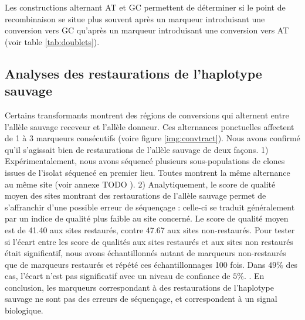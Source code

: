 Les constructions alternant AT et GC permettent de déterminer si le point de
recombinaison se situe plus souvent après un marqueur introduisant une
conversion vers GC qu'après un marqueur introduisant une conversion vers AT
(voir table \ref{tab:doublets}).



\subsection{Analyses des restaurations de l'haplotype sauvage}
\label{subsec:restaur}


Certains transformants montrent des régions de conversions qui alternent entre
l'allèle sauvage receveur et l'allèle donneur. Ces alternances ponctuelles
affectent de 1 à 3 marqueurs consécutifs (voire figure \ref{img:convtract}).
Nous avons confirmé qu'il s'agissait bien de restaurations de l'allèle sauvage
de deux façons. 1) Expérimentalement, nous avons séquencé plusieurs
sous-populations de clones issues de l'isolat séquencé en premier lieu. Toutes
montrent la même alternance au même site (voir annexe TODO
). 2) Analytiquement, le score de qualité moyen des sites montrant des
restaurations de l'allèle sauvage permet de s'affranchir d'une possible erreur
de séquençage : celle-ci se traduit généralement par un indice de qualité plus
faible au site concerné. Le score de qualité moyen est de 41.40 aux sites
restaurés, contre 47.67 aux sites non-restaurés. Pour tester si l'écart entre
les score de qualités aux sites restaurés et aux sites non restaurés était
significatif, nous avons échantillonnés autant de marqueurs non-restaurés que de
marqueurs restaurés et répété ces échantillonnages 100 fois. Dans $49\%$ des
cas, l'écart n'est pas significatif avec un niveau de confiance de $5\%$.
. En conclusion, les marqueurs correspondant à des restaurations de l'haplotype
sauvage ne sont pas des erreurs de séquençage, et correspondent à un signal
biologique.

